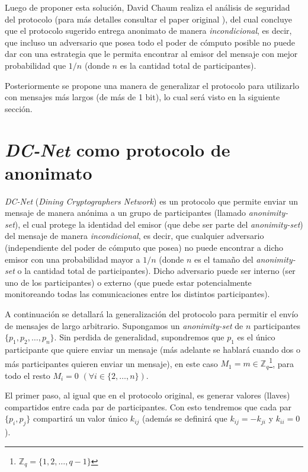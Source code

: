 
Luego de proponer esta solución, David Chaum realiza el análisis de seguridad del protocolo (para más detalles consultar el paper original 
\cite{chaum1988dining}), del cual concluye que el protocolo sugerido entrega anonimato de manera \emph{incondicional}, es decir, que incluso 
un adversario que posea todo el poder de cómputo posible no puede dar con una estrategia que le permita encontrar al emisor del mensaje 
con mejor probabilidad que $1/n$ (donde $n$ es la cantidad total de participantes).

Posteriormente se propone una manera de generalizar el protocolo para utilizarlo con mensajes más largos (de más de 1 bit), lo cual será 
visto en la siguiente sección.

\section{\emph{DC-Net} como protocolo de anonimato}

\emph{DC-Net} (\emph{Dining Cryptographers Network}) es un protocolo que permite enviar un mensaje de manera anónima a un grupo de participantes 
(llamado \emph{anonimity-set}), el cual protege la identidad del emisor (que debe ser parte del \emph{anonimity-set}) del mensaje de manera 
\emph{incondicional}, es decir, que cualquier adversario (independiente del poder de cómputo que posea) no puede encontrar a dicho emisor con 
una probabilidad mayor a $1/n$ (donde $n$ es el tamaño del \emph{anonimity-set} o la cantidad total de participantes). Dicho adversario puede 
ser interno (ser uno de los participantes) o externo (que puede estar potencialmente monitoreando todas las comunicaciones entre los distintos participantes).

A continuación se detallará la generalización del protocolo para permitir el envío de mensajes de largo arbitrario. 
Supongamos un \emph{anonimity-set} de $n$ participantes $\{p_1, p_2, \ldots, p_n\}$. Sin perdida de generalidad, supondremos que $p_1$ es el único 
participante que quiere enviar un mensaje (más adelante 
se hablará cuando dos o más participantes quieren enviar un mensaje), 
en este caso $M_1 = m \in \mathbb{Z}_q$\footnote{$\mathbb{Z}_q = \{1, 2, \ldots, q - 1\}$}, para todo el resto $M_i = 0$ $(\forall i \in \{2, \ldots, n\})$.

El primer paso, al igual que en el protocolo original, es generar valores (llaves) compartidos entre cada par de participantes. Con esto 
tendremos que cada par $\{p_i, p_j\}$ compartirá un valor único $k_{ij}$ (además se definirá que $k_{ij} = -k_{ji}$ y $k_{ii} = 0$).

